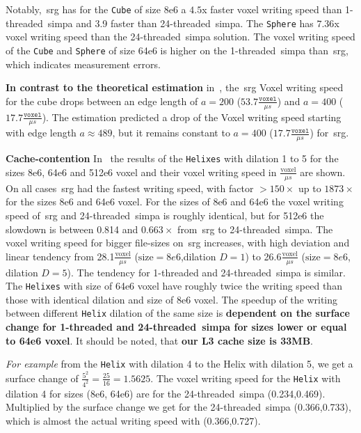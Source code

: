 \documentclass{article}
\begin{document}
Notably,~\ac{srg} has for the \texttt{Cube} of size 8e6 a $4.5$x faster voxel writing speed than 1-threaded~\ac{simpa} and 3.9 faster than 24-threaded~\ac{simpa}.
The \texttt{Sphere} has $7.36$x voxel writing speed than the 24-threaded~\ac{simpa} solution.
The voxel writing speed of the \texttt{Cube} and \texttt{Sphere} of size 64e6 is higher on the 1-threaded~\ac{simpa} than~\ac{srg}, which indicates measurement errors.\par
\textbf{In contrast to the theoretical estimation} in~, the~\ac{srg} Voxel writing speed for the cube drops between an edge length of $a = 200$ ($53.7 \frac{\texttt{voxel}}{\mu s}$) and $a=400$ ($17.7 \frac{\texttt{voxel}}{\mu s}$).
The estimation predicted a drop of the Voxel writing speed starting with edge length $a\approx 489$, but it remains constant to $a=400$ ($17.7 \frac{\texttt{voxel}}{\mu s}$) for~\ac{srg}.

\textbf{Cache-contention}
In~ the results of the \texttt{Helixes} with dilation 1 to 5 for the sizes 8e6, 64e6 and 512e6 voxel and their voxel writing speed in $\frac{\text{voxel}}{\mu s}$ are shown.
On all cases~\ac{srg} had the fastest writing speed, with factor $>150\times$ up to $1873\times$ for the sizes 8e6 and 64e6 voxel.
For the sizes of 8e6 and 64e6 the voxel writing speed of~\ac{srg} and 24-threaded~\ac{simpa} is roughly identical, but for 512e6 the slowdown is between 0.814 and $0.663\times$ from~\ac{srg} to 24-threaded~\ac{simpa}.
The voxel writing speed for bigger file-sizes on~\ac{srg} increases, with high deviation and linear tendency from 28.1$\frac{\text{voxel}}{\mu s}$ ($\text{size} = 8e6$,dilation $D=1$) to 26.6$\frac{\text{voxel}}{\mu s}$  ($\text{size} = 8e6$, dilation $D=5$).
The tendency for 1-threaded and 24-threaded~\ac{simpa} is similar.
The \texttt{Helixes} with size of 64e6 voxel have roughly twice the writing speed than those with identical dilation and size of 8e6 voxel.
The speedup of the writing between different \texttt{Helix} dilation of the same size is \textbf{dependent on the surface change for 1-threaded and 24-threaded~\ac{simpa} for sizes lower or equal to 64e6 voxel}. It should be noted, that \textbf{our L3 cache size is 33MB}.\par
\textit{For example} from the \texttt{Helix} with dilation 4 to the Helix with dilation 5, we get a surface change of $\frac{5^2}{4^2}=\frac{25}{16}=1.5625$.
The voxel writing speed for the \texttt{Helix} with dilation 4 for sizes (8e6, 64e6) are for the 24-threaded~\ac{simpa} (0.234,0.469).
Multiplied by the surface change we get for the 24-threaded~\ac{simpa} (0.366,0.733), which is almost the actual writing speed with (0.366,0.727).
\end{document}
